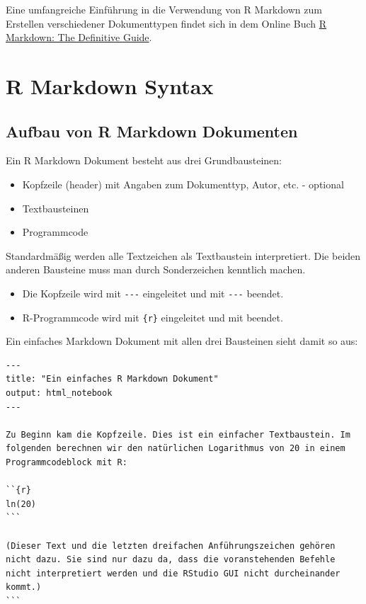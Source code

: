 \documentclass[
]{article}
\providecommand{\tightlist}{%
  \setlength{\itemsep}{0pt}\setlength{\parskip}{0pt}}
\begin{document}
Eine umfangreiche Einführung in die Verwendung von R Markdown zum
Erstellen verschiedener Dokumenttypen findet sich in dem Online Buch
\href{https://bookdown.org/yihui/rmarkdown/}{R Markdown: The Definitive
Guide}.

\hypertarget{r-markdown-syntax}{%
\section{R Markdown Syntax}\label{r-markdown-syntax}}

\hypertarget{aufbau-von-r-markdown-dokumenten}{%
\subsection{Aufbau von R Markdown
Dokumenten}\label{aufbau-von-r-markdown-dokumenten}}

Ein R Markdown Dokument besteht aus drei Grundbausteinen:

\begin{itemize}
\tightlist
\item
  Kopfzeile (header) mit Angaben zum Dokumenttyp, Autor, etc. - optional
\item
  Textbausteinen
\item
  Programmcode
\end{itemize}

Standardmäßig werden alle Textzeichen als Textbaustein interpretiert.
Die beiden anderen Bausteine muss man durch Sonderzeichen kenntlich
machen.

\begin{itemize}
\tightlist
\item
  Die Kopfzeile wird mit \texttt{-\/-\/-} eingeleitet und mit
  \texttt{-\/-\/-} beendet.
\item
  R-Programmcode wird mit
  \texttt{\textasciigrave{}\textasciigrave{}\textasciigrave{}\{r\}}
  eingeleitet und mit
  \texttt{\textasciigrave{}\textasciigrave{}\textasciigrave{}} beendet.
\end{itemize}

Ein einfaches Markdown Dokument mit allen drei Bausteinen sieht damit so
aus:

\begin{verbatim}
--- 
title: "Ein einfaches R Markdown Dokument"
output: html_notebook
---

Zu Beginn kam die Kopfzeile. Dies ist ein einfacher Textbaustein. Im folgenden berechnen wir den natürlichen Logarithmus von 20 in einem Programmcodeblock mit R: 

``{r}
ln(20)
```

(Dieser Text und die letzten dreifachen Anführungszeichen gehören nicht dazu. Sie sind nur dazu da, dass die voranstehenden Befehle nicht interpretiert werden und die RStudio GUI nicht durcheinander kommt.)
``` 
\end{verbatim}
\end{document}
